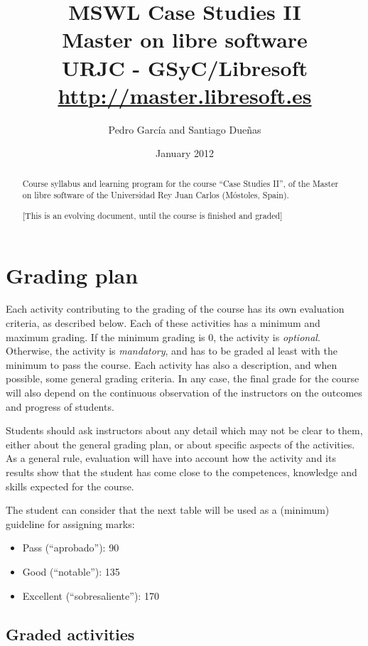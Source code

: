 \documentclass[a4paper]{article}
\title{MSWL Case Studies II \\
Master on libre software \\
URJC - GSyC/Libresoft \\
\url{http://master.libresoft.es}}
\author{Pedro García and Santiago Dueñas}
\date{January 2012}
\begin{document}
\maketitle

\begin{abstract}
Course syllabus and learning program for the course ``Case Studies II'', 
of the Master on libre software of the Universidad Rey Juan Carlos (Móstoles, Spain).

[This is an evolving document, until the course is finished and graded]
\end{abstract}

\tableofcontents

\section{Grading plan}

Each activity contributing to the grading of the course has its own evaluation criteria, 
as described below. Each of these activities has a minimum and maximum grading. If the 
minimum grading is 0, the activity is \textit{optional}. Otherwise, the activity is \textit{mandatory}, and 
has to be graded al least with the minimum to pass the course. Each activity has also a 
description, and when possible, some general grading criteria. In any case, the final grade 
for the course will also depend on the continuous observation of the instructors on the 
outcomes and progress of students.

Students should ask instructors about any detail which may not be clear to them, 
either about the general grading plan, or about specific aspects of the activities. 
As a general rule, evaluation will have into account how the activity and its results 
show that the student has come close to the competences, knowledge and skills expected 
for the course.

The student can consider that the next table will be used as a (minimum) guideline for 
assigning marks:

\begin{itemize}
\item Pass (``aprobado''): 90
\item Good (``notable''): 135
\item Excellent (``sobresaliente''): 170
\end{itemize}

\subsection{Graded activities}
\end{document}
